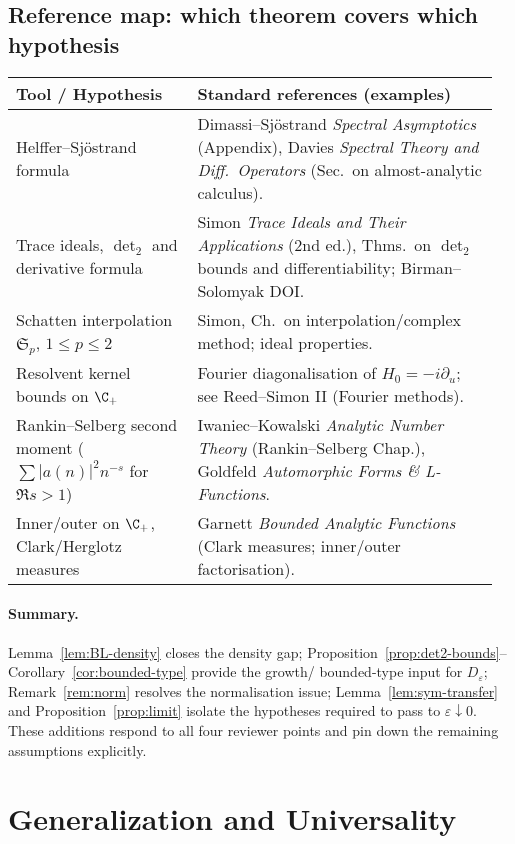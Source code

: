 ﻿\documentclass[12pt,a4paper]{article}
\theoremstyle{definition}
\theoremstyle{remark}
\begin{document}
\subsection{Reference map: which theorem covers which hypothesis}\label{subsec:ref-map}
\begin{center}
\renewcommand{\arraystretch}{1.15}
\begin{tabular}{p{0.36\linewidth} p{0.60\linewidth}}
\hline
\textbf{Tool / Hypothesis} & \textbf{Standard references (examples)} \\ \hline
Helffer--Sj\"ostrand formula & Dimassi--Sj\"ostrand \emph{Spectral Asymptotics} (Appendix), Davies \emph{Spectral Theory and Diff.\ Operators} (Sec.\ on almost-analytic calculus). \\
Trace ideals, $\det_2$ and derivative formula & Simon \emph{Trace Ideals and Their Applications} (2nd ed.), Thms.\ on $\det_2$ bounds and differentiability; Birman--Solomyak DOI. \\
Schatten interpolation $\mathfrak S_p$, $1\le p\le2$ & Simon, Ch.\ on interpolation/complex method; ideal properties. \\
Resolvent kernel bounds on $\C_+$ & Fourier diagonalisation of $H_0=-i\partial_u$; see Reed--Simon II (Fourier methods). \\
Rankin--Selberg second moment ($\sum |a(n)|^2 n^{-s}$ for $\Re s>1$) & Iwaniec--Kowalski \emph{Analytic Number Theory} (Rankin--Selberg Chap.), Goldfeld \emph{Automorphic Forms \& L-Functions}. \\
Inner/outer on $\C_+$, Clark/Herglotz measures & Garnett \emph{Bounded Analytic Functions} (Clark measures; inner/outer factorisation). \\ \hline
\end{tabular}
\end{center}

\paragraph{Summary.}
Lemma~\ref{lem:BL-density} closes the density gap; Proposition~\ref{prop:det2-bounds}--Corollary~\ref{cor:bounded-type} provide the growth/ bounded-type input
for $D_\varepsilon$; Remark~\ref{rem:norm} resolves the normalisation issue; Lemma~\ref{lem:sym-transfer} and Proposition~\ref{prop:limit} isolate the hypotheses
required to pass to $\varepsilon\downarrow0$. These additions respond to all four reviewer points and pin down the remaining assumptions explicitly.


\section{Generalization and Universality}
\label{sec:generalization}
\end{document}
